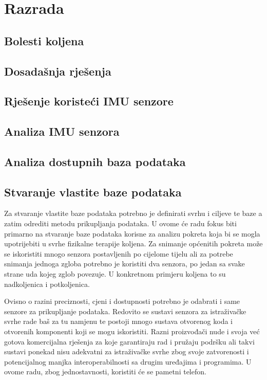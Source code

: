 \documentclass[times, utf8, diplomski]{fer}
\begin{document}
\chapter{Razrada}

\section{Bolesti koljena}

\section{Dosadašnja rješenja}

\section{Rješenje koristeći IMU senzore}

\section{Analiza IMU senzora}

\section{Analiza dostupnih baza podataka}

\section{Stvaranje vlastite baze podataka}
Za stvaranje vlastite baze podataka potrebno je definirati svrhu i ciljeve te baze a zatim odrediti metodu prikupljanja podataka. U ovome će radu
fokus biti primarno na stvaranje baze podataka korisne za analizu pokreta koja bi se mogla upotrijebiti u svrhe fizikalne terapije koljena.
Za snimanje općenitih pokreta može se iskoristiti mnogo senzora postavljenih po cijelome tijelu ali za potrebe snimanja jednoga zgloba potrebno je 
koristiti dva senzora, po jedan sa svake strane uda kojeg zglob povezuje. U konkretnom primjeru koljena to su nadkoljenica i potkoljenica.

Ovisno o razini preciznosti, cjeni i dostupnosti potrebno je odabrati i same senzore za prikupljanje podataka. Redovito se sustavi senzora
za istraživačke svrhe rade baš za tu namjenu te postoji mnogo sustava otvorenog koda i otvorenih komponenti koji se mogu iskoristiti. Razni
proizvođači nude i svoja već gotova komercijalna rješenja za koje garantiraju rad i pružaju podršku ali takvi sustavi ponekad nisu adekvatni za
istraživačke svrhe zbog svoje zatvorenosti i potencijalnog manjka interoperabilnosti sa drugim uređajima i programima. U ovome radu, zbog jednostavnosti,
koristiti će se pametni telefon.
\end{document}
